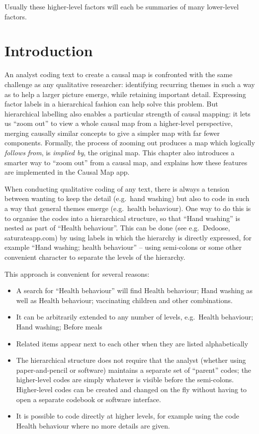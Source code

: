 \documentclass[
]{book}
\begin{document}
Usually these higher-level factors will each be summaries of many lower-level factors.

\hypertarget{introduction}{%
\section{Introduction}\label{introduction}}

An analyst coding text to create a causal map is confronted with the same challenge as any qualitative researcher: identifying recurring themes in such a way as to help a larger picture emerge, while retaining important detail. Expressing factor labels in a hierarchical fashion can help solve this problem. But hierarchical labelling also enables a particular strength of causal mapping: it lets us ``zoom out'' to view a whole causal map from a higher-level perspective, merging causally similar concepts to give a simpler map with far fewer components. Formally, the process of zooming out produces a map which logically \emph{follows} \emph{from}, is \emph{implied by}, the original map. This chapter also introduces a smarter way to ``zoom out'' from a causal map, and explains how these features are implemented in the Causal Map app.

When conducting qualitative coding of any text, there is always a tension between wanting to keep the detail (e.g.~hand washing) but also to code in such a way that general themes emerge (e.g.~health behaviour). One way to do this is to organise the codes into a hierarchical structure, so that ``Hand washing'' is nested as part of ``Health behaviour''. This can be done (see e.g.~Dedoose, saturateapp.com) by using labels in which the hierarchy is directly expressed, for example ``Hand washing; health behaviour'' -- using semi-colons or some other convenient character to separate the levels of the hierarchy.

This approach is convenient for several reasons:

\begin{itemize}
\item
  A search for ``Health behaviour'' will find Health behaviour; Hand washing as well as Health behaviour; vaccinating children and other combinations.
\item
  It can be arbitrarily extended to any number of levels, e.g.~Health behaviour; Hand washing; Before meals
\item
  Related items appear next to each other when they are listed alphabetically
\item
  The hierarchical structure does not require that the analyst (whether using paper-and-pencil or software) maintains a separate set of ``parent'' codes; the higher-level codes are simply whatever is visible before the semi-colons. Higher-level codes can be created and changed on the fly without having to open a separate codebook or software interface.
\item
  It is possible to code directly at higher levels, for example using the code Health behaviour where no more details are given.
\end{itemize}
\end{document}

